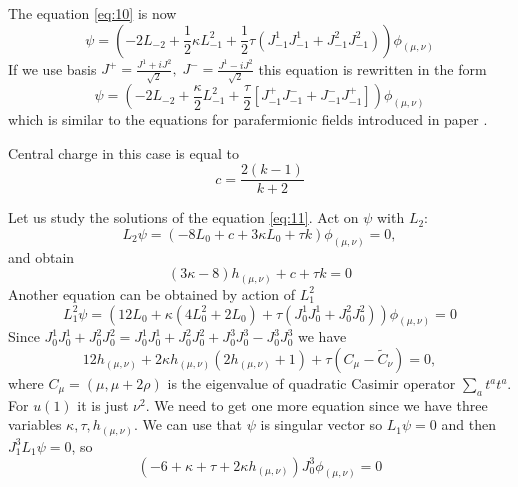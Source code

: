 \documentclass[a4paper]{jpconf}
\theoremstyle{definition}
\theoremstyle{definition} \newtheorem{Def}{Definition}
\begin{document}
 The equation \eqref{eq:10} is now
\begin{equation}
  \label{eq:11}
  \psi=\left(-2L_{-2}+\frac{1}{2}\kappa L_{-1}^{2}+\frac{1}{2}\tau \left(J^{1}_{-1}J^{1}_{-1}+J^{2}_{-1}J^{2}_{-1}\right)\right) \phi_{(\mu,\nu)}
\end{equation}
If we use basis $J^{+}=\frac{J^{1}+iJ^{2}}{\sqrt{2}},\; J^{-}=\frac{J^{1}-iJ^{2}}{\sqrt{2}}$ this equation is rewritten in the form
\begin{equation}
 \psi= \left(-2 L_{-2}+\frac{\kappa}{2}L_{-1}^{2}+\frac{\tau}{2}\left[J^{+}_{-1}J^{-}_{-1}+J^{-}_{-1}J^{+}_{-1}\right]\right) \phi_{(\mu,\nu)}
\label{eq:12}
\end{equation}
which is similar to the equations for parafermionic fields introduced in paper \cite{santachiara2008sle}.

Central charge in this case is equal to
\begin{equation}
  \label{eq:14}
  c=\frac{2(k-1)}{k+2}
\end{equation}

Let us study the solutions of the equation \eqref{eq:11}. Act on $\psi$ with $L_{2}$:
\begin{equation}
  \label{eq:13}
  L_{2}\psi=(-8L_{0}+c+3\kappa L_{0}+\tau k)\phi_{(\mu,\nu)}=0,
\end{equation}
and obtain
\begin{equation}
  \label{eq:28}
  (3\kappa-8) h_{(\mu,\nu)}+c+\tau k =0
\end{equation}
Another equation can be obtained by action of $L_{1}^{2}$
\begin{equation}
  \label{eq:15}
  L_{1}^{2}\psi = (12 L_{0} + \kappa(4 L_{0}^{2}+2 L_{0}) +\tau (J_{0}^{1}J_{0}^{1}+J_{0}^{2}J_{0}^{2}))\phi_{(\mu,\nu)}=0
\end{equation}
Since $J_{0}^{1}J_{0}^{1}+J_{0}^{2}J_{0}^{2}=J_{0}^{1}J_{0}^{1}+J_{0}^{2}J_{0}^{2}+J_{0}^{3}J_{0}^{3}-J_{0}^{3}J_{0}^{3}$ we have
\begin{equation}
  \label{eq:17}
  12 h_{(\mu,\nu)}+2\kappa h_{(\mu,\nu)} (2h_{(\mu,\nu)}+1) +  \tau (C_{\mu}-\tilde{C}_{\nu})=0,
\end{equation}
where $C_{\mu}=(\mu,\mu+2\rho)$ is the eigenvalue of quadratic Casimir operator $\sum_{a}t^{a}t^{a}$. For $u(1)$ it is just $\nu^{2}$.
We need to get one more equation since we have three variables $\kappa,\tau,h_{(\mu,\nu)}$. We can use that $\psi$ is singular vector so $L_{1}\psi=0$ and then $J_{1}^{3}L_{1}\psi=0$, so
\begin{equation}
  \label{eq:29}
  \left(-6  + \kappa +  \tau +  2 \kappa h_{(\mu,\nu)}\right) J^{3}_{0} \phi_{(\mu,\nu)}=0
\end{equation}
\end{document}
